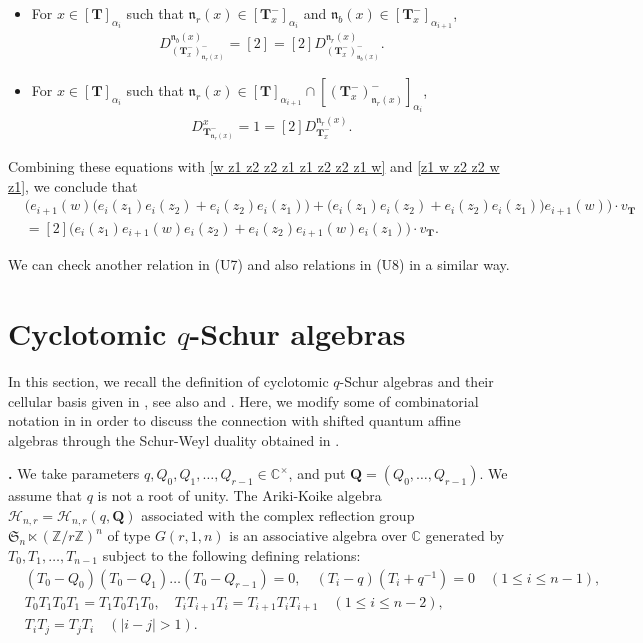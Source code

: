 \documentclass[12pt]{amsart}
\def \para{\refstepcounter{thm} \par\medskip\noindent
                \textbf{\thethm .} }
\numberwithin{equation}{thm}
\newcommand\CC{\mathbb C}
\newcommand\ZZ{\mathbb Z}
\newcommand\bQ{\mathbf Q}
\newcommand\bT{\mathbf T}
\newcommand\fS{\mathfrak S}
\newcommand\fn{\mathfrak n}
\newcommand\sH{\mathscr H}
\renewcommand\a{\alpha}  %
\newcounter{ni}
\begin{document}
\begin{itemize}
\item 
For $x \in [\bT]_{\a_i}$ such that $\fn_r(x) \in [\bT_x^-]_{\a_i}$ and $\fn_b(x) \in [\bT_x^-]_{\a_{i+1}}$, 
\begin{align*}
D_{(\bT_x^-)_{\fn_r(x)}^-}^{\fn_b(x)} 
= [2] 
=[2] D_{(\bT_x^-)_{\fn_b(x)}^-}^{\fn_r(x)}. 
\end{align*}

\item  
For $x \in [\bT]_{\a_i}$ such that $\fn_r(x) \in [\bT]_{\a_{i+1}} \cap [(\bT_x^-)_{\fn_r(x)}^-]_{\a_i}$, 
\begin{align*}
D_{\bT_{\fn_r(x)}^-}^x =1 = [2] D_{\bT_x^-}^{\fn_r(x)}. 
\end{align*}
\end{itemize} 

Combining these equations with \eqref{w z1 z2 z2 z1 z1 z2 z2 z1 w} and \eqref{z1 w z2 z2 w z1}, 
we conclude that 
\begin{align*}
&\Big( e_{i+1} (w) \big( e_i (z_1) e_i(z_2) + e_i(z_2) e_i(z_1) \big) 
 	+ \big( e_i(z_1) e_i(z_2) + e_i(z_2) e_i (z_1) \big) e_{i+1} (w) \Big) \cdot v_{\bT} 
\\
&= [2] \Big( e_i(z_1) e_{i+1} (w) e_i(z_2) + e_i(z_2) e_{i+1} (w) e_i(z_1) \Big) \cdot v_{\bT}. 
\end{align*}

We can check another relation in (U7) and also relations in (U8) in a similar way. 




\section{Cyclotomic $q$-Schur algebras} 

In this section, we recall the definition of cyclotomic $q$-Schur algebras and their cellular basis given in \cite{DJM98}, 
see also \cite{Mat04} and \cite{JM00}. 
Here, we modify some of combinatorial notation in \cite{DJM98} 
in order to discuss the connection with shifted quantum affine algebras through the Schur-Weyl duality obtained in \cite{Wad24}. 

\para 
We take parameters $q, Q_0,Q_1,\dots, Q_{r-1} \in \CC^{\times}$, and put $\bQ=(Q_0,\dots, Q_{r-1})$. 
We assume that $q$ is not a root of unity. 
The Ariki-Koike algebra $\sH_{n,r} = \sH_{n,r}(q,\bQ)$ associated with the complex reflection group 
$\fS_n \ltimes (\ZZ / r \ZZ)^n$ of type $G(r,1,n)$  is an associative algebra over $\CC$ generated by 
$T_0, T_1,\dots, T_{n-1}$ subject to the following defining relations: 
\begin{align*}
&(T_0- Q_0) (T_0-Q_1) \dots (T_0-Q_{r-1})=0, 
	\quad 
	(T_i-q) (T_i + q^{-1})=0 
	\quad (1 \leq i \leq n-1), 
\\
& T_0 T_1 T_0 T_1 = T_1 T_0 T_1 T_0, 
	\quad 
	T_i T_{i+1} T_i = T_{i+1} T_i T_{i+1} \quad (1 \leq i \leq n-2), 
\\
& T_i T_j = T_j T_i \quad (|i-j| >1). 
\end{align*} 
\end{document}
